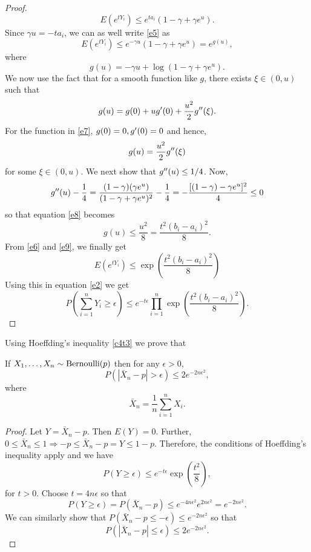 \documentclass{article}
\begin{document}
\begin{proof}
\begin{equation}
E(e^{tY_i}) \le e^{ta_i}(1 - \gamma + \gamma e^u).
\end{equation}
Since $\gamma u = -ta_i$, we can as well write \eqref{e5} as
\begin{equation}\label{e6}
E(e^{tY_i}) \le e^{-\gamma u}(1 - \gamma + \gamma e^u) = e^{g(u)},
\end{equation}
where
\begin{equation}\label{e7}
g(u) = -\gamma u + \log(1 - \gamma + \gamma e^u).
\end{equation}
We now use the fact that for a smooth function like $g$, there exists $\xi \in
(0, u)$ such that
\[
g(u) = g(0) + ug^\prime(0) + \frac{u^2}{2}g^{\prime\prime}(\xi).
\]
For the function in \eqref{e7}, $g(0) = 0, g^\prime(0) = 0$ and hence,
\begin{equation}\label{e8}
g(u) = \frac{u^2}{2}g^{\prime\prime}(\xi)
\end{equation}
for some $\xi \in (0, u)$. We next show that $g^{\prime\prime}(u) \le 1/4$. Now, 
\[
g^{\prime\prime}(u) - \frac{1}{4} = 
\frac{(1 - \gamma)(\gamma e^u)}{(1 - \gamma + \gamma e^u)^2} - \frac{1}{4}
= -\frac{[(1 - \gamma) - \gamma e^u]^2}{4} \le 0
\]
so that equation \eqref{e8} becomes
\begin{equation}\label{e9}
g(u) \le \frac{u^2}{8} = \frac{t^2(b_i - a_i)^2}{8}.
\end{equation}
From \eqref{e6} and \eqref{e9}, we finally get
\[
E(e^{tY_i}) \le  \exp\left(\frac{t^2(b_i - a_i)^2}{8}\right)
\]
Using this in equation \eqref{e2} we get
\begin{equation}\label{e10}
P\left(\sum_{i=1}^n Y_i \ge \epsilon\right) \le e^{-t\epsilon}
\prod_{i=1}^n\exp\left(\frac{t^2(b_i - a_i)^2}{8}\right).
\end{equation}
\end{proof}

Using Hoeffding's inequality \ref{c4t3} we prove that
\begin{thm}\label{c4t4}
If $X_1, \ldots, X_n \sim \text{Bernoulli}(p)$ then for any $\epsilon > 0$,
\[
P(|\bar{X}_n - p| > \epsilon) \le 2e^{-2n\epsilon^2},
\]
where 
\[
\bar{X}_n = \frac{1}{n}\sum_{i=1}^nX_i.
\]
\end{thm}
\begin{proof}
Let $Y = \bar{X}_n - p$. Then $E(Y) = 0$. Further, $0 \le \bar{X}_n \le 1
\Rightarrow -p \le \bar{X}_n - p = Y \le 1 - p$. Therefore, the conditions of
Hoeffding's inequality apply and we have
\[
P(Y \ge \epsilon) \le e^{-t\epsilon}\exp\left(\frac{t^2}{8}\right),
\]
for $t > 0$. Choose $t = 4n\epsilon$ so that
\[
P(Y \ge \epsilon) = P(\bar{X}_n - p) \le e^{-4n\epsilon^2}e^{2n\epsilon^2} =
e^{-2n\epsilon^2}.
\]
We can similarly show that $P(\bar{X}_n-p \le -\epsilon) \le e^{-2n\epsilon^2}$
so that
\[
P(|\bar{X}_n - p| \le \epsilon) \le 2e^{-2n\epsilon^2}.
\]
\end{proof}
\end{document}

